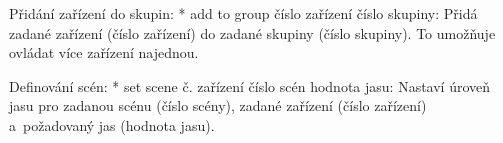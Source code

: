 \medskip\noindent
{\sbf Přidání zařízení do skupin:}
\begitems
    * {\sbf add to group číslo zařízení číslo skupiny:}
        Přidá zadané zařízení (číslo zařízení) do zadané skupiny (číslo skupiny).
        To umožňuje ovládat více zařízení najednou.
\enditems

\medskip\noindent
{\sbf Definování scén:}
\begitems
    * {\sbf set scene č. zařízení číslo scén hodnota jasu:}
        Nastaví úroveň jasu pro zadanou scénu (číslo scény), zadané zařízení
        (číslo zařízení) a~požadovaný jas (hodnota jasu).
\enditems













